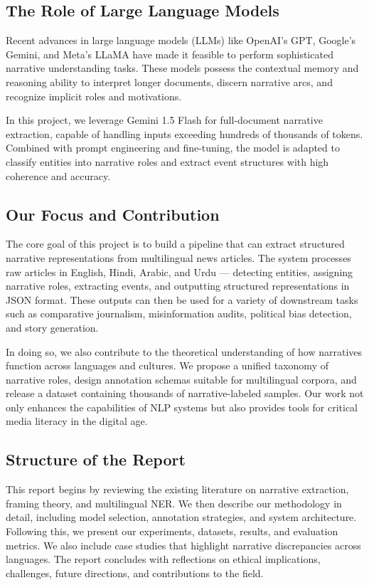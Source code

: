 \documentclass[12pt]{article}
\begin{document}
\subsection*{The Role of Large Language Models}

Recent advances in large language models (LLMs) like OpenAI’s GPT, Google’s Gemini, and Meta’s LLaMA have made it feasible to perform sophisticated narrative understanding tasks. These models possess the contextual memory and reasoning ability to interpret longer documents, discern narrative arcs, and recognize implicit roles and motivations.

In this project, we leverage Gemini 1.5 Flash for full-document narrative extraction, capable of handling inputs exceeding hundreds of thousands of tokens. Combined with prompt engineering and fine-tuning, the model is adapted to classify entities into narrative roles and extract event structures with high coherence and accuracy.

\subsection*{Our Focus and Contribution}

The core goal of this project is to build a pipeline that can extract structured narrative representations from multilingual news articles. The system processes raw articles in English, Hindi, Arabic, and Urdu — detecting entities, assigning narrative roles, extracting events, and outputting structured representations in JSON format. These outputs can then be used for a variety of downstream tasks such as comparative journalism, misinformation audits, political bias detection, and story generation.

In doing so, we also contribute to the theoretical understanding of how narratives function across languages and cultures. We propose a unified taxonomy of narrative roles, design annotation schemas suitable for multilingual corpora, and release a dataset containing thousands of narrative-labeled samples. Our work not only enhances the capabilities of NLP systems but also provides tools for critical media literacy in the digital age.

\subsection*{Structure of the Report}

This report begins by reviewing the existing literature on narrative extraction, framing theory, and multilingual NER. We then describe our methodology in detail, including model selection, annotation strategies, and system architecture. Following this, we present our experiments, datasets, results, and evaluation metrics. We also include case studies that highlight narrative discrepancies across languages. The report concludes with reflections on ethical implications, challenges, future directions, and contributions to the field.
\end{document}
